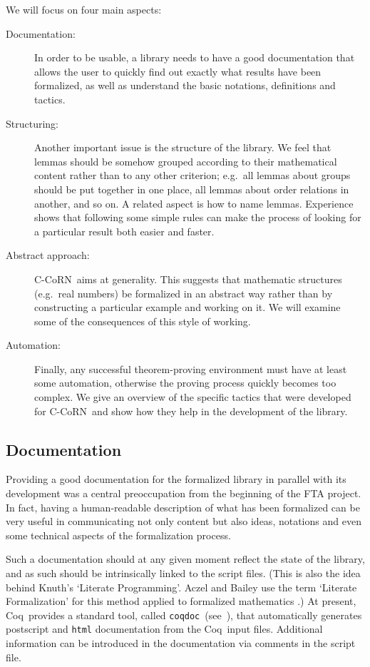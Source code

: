 \documentclass[runningheads]{llncs}
\newcommand{\ccorn}{\mbox{C-CoRN}}
\newcommand{\coq}{Coq}
\newcommand{\coqdoc}{\texttt{coqdoc}}
\newcommand{\fta}{FTA}
\begin{document}
We will focus on four main aspects:
\begin{description}
\item[Documentation:] In order to be usable, a library needs to have a good
documentation that allows the user to quickly find out exactly what results
have been formalized, as well as understand the basic notations, definitions
and tactics.
\item[Structuring:] Another important issue is the structure of the library.
We feel that lemmas should be somehow grouped according to their mathematical
content rather than to any other criterion; e.g.\ all lemmas about groups
should be put together in one place, all lemmas about order relations in
another, and so on.
A related aspect is how to name lemmas.
Experience shows that following some simple rules can make the process of
looking for a particular result both easier and faster.
\item[Abstract approach:] \ccorn\ aims at generality.
This suggests that mathematic structures (e.g.\ real numbers) be formalized in
an abstract way rather than by constructing a particular example and working
on it.
We will examine some of the consequences of this style of working.
\item[Automation:] Finally, any successful theorem-proving environment must
have at least some automation, otherwise the proving process quickly becomes
too complex.
We give an overview of the specific tactics that were developed for \ccorn\ 
and show how they help in the development of the library.
\end{description}

\subsection*{Documentation}

Providing a good documentation for the formalized library in parallel
with its development was a central preoccupation from the beginning of
the {\fta} project.  In fact, having a human-readable description of
what has been formalized can be very useful in communicating not only
content but also ideas, notations and even some technical aspects of
the formalization process.

Such a documentation should at any given moment reflect the state of
the library, and as such should be intrinsically linked to the script
files.  (This is also the idea behind Knuth's `Literate Programming'.
Aczel and Bailey use the term `Literate Formalization'
for this method applied to formalized mathematics \cite{bailey1998}.)
At present, \coq\ provides a standard tool, called \coqdoc\ 
(see~\cite{coqdocmanual}), that automatically generates postscript and
\texttt{html} documentation from the \coq\ input files.  Additional
information can be introduced in the documentation via comments in the
script file.
\end{document}
